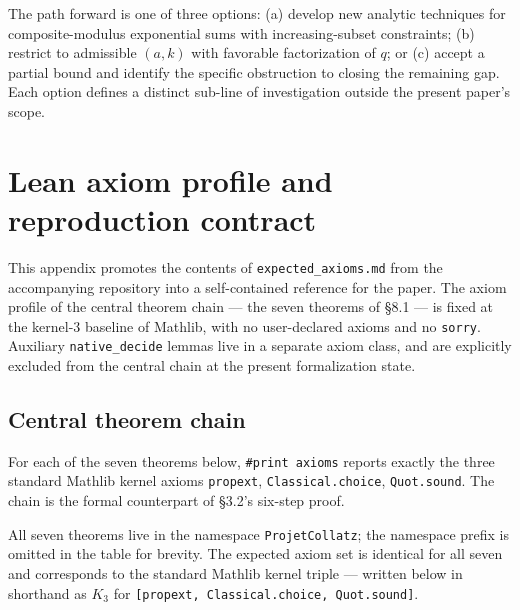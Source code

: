 \documentclass[
  11pt]{amsart}
\theoremstyle{plain}
\theoremstyle{definition}
\theoremstyle{remark}
\begin{document}
The path forward is one of three options: (a) develop new analytic
techniques for composite-modulus exponential sums with increasing-subset
constraints; (b) restrict to admissible \((a, k)\) with favorable
factorization of \(q\); or (c) accept a partial bound and identify the
specific obstruction to closing the remaining gap. Each option defines a
distinct sub-line of investigation outside the present paper's scope.

\section{Lean axiom profile and reproduction
contract}\label{lean-axiom-profile-and-reproduction-contract}

This appendix promotes the contents of \texttt{expected\_axioms.md} from
the accompanying repository into a self-contained reference for the
paper. The axiom profile of the central theorem chain --- the seven
theorems of §8.1 --- is fixed at the kernel-3 baseline of Mathlib, with
no user-declared axioms and no \texttt{sorry}. Auxiliary
\texttt{native\_decide} lemmas live in a separate axiom class, and are
explicitly excluded from the central chain at the present formalization
state.

\subsection{Central theorem chain}\label{central-theorem-chain}

For each of the seven theorems below, \texttt{\#print\ axioms} reports
exactly the three standard Mathlib kernel axioms \texttt{propext},
\texttt{Classical.choice}, \texttt{Quot.sound}. The chain is the formal
counterpart of §3.2's six-step proof.

All seven theorems live in the namespace \texttt{ProjetCollatz}; the
namespace prefix is omitted in the table for brevity. The expected axiom
set is identical for all seven and corresponds to the standard Mathlib
kernel triple --- written below in shorthand as \(K_3\) for
\texttt{{[}propext,\ Classical.choice,\ Quot.sound{]}}.
\end{document}
